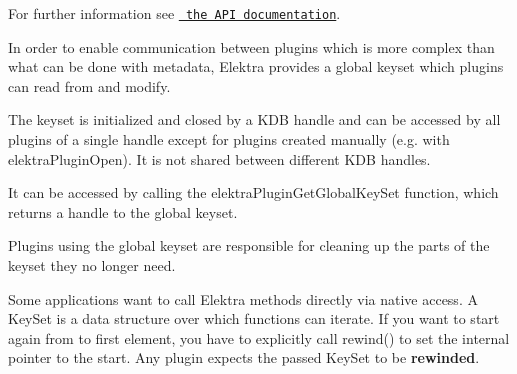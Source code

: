 For further information see \href{https://doc.libelektra.org/api/current/html/group__plugin.html}{\texttt{ the A\+PI documentation}}.

In order to enable communication between plugins which is more complex than what can be done with metadata, Elektra provides a global keyset which plugins can read from and modify.

The keyset is initialized and closed by a K\+DB handle and can be accessed by all plugins of a single handle except for plugins created manually (e.\+g. with {\ttfamily elektra\+Plugin\+Open}). It is not shared between different K\+DB handles.

It can be accessed by calling the {\ttfamily elektra\+Plugin\+Get\+Global\+Key\+Set} function, which returns a handle to the global keyset.

Plugins using the global keyset are responsible for cleaning up the parts of the keyset they no longer need.

Some applications want to call Elektra methods directly via native access. A {\ttfamily Key\+Set} is a data structure over which functions can iterate. If you want to start again from to first element, you have to explicitly call {\ttfamily rewind()} to set the internal pointer to the start. Any plugin expects the passed {\ttfamily Key\+Set} to be {\bfseries{rewinded}}. 